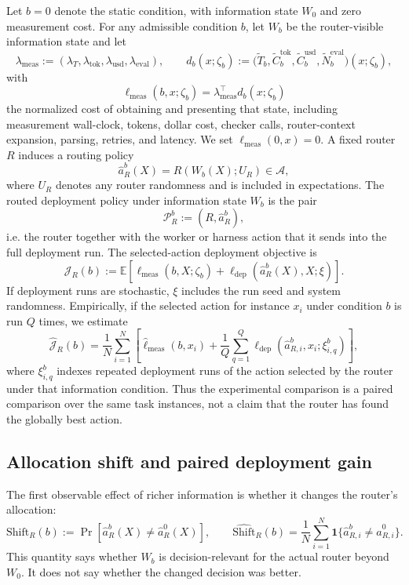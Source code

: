 \documentclass{article}
\newcommand{\cA}{\mathcal{A}}
\newcommand{\E}{\mathbb{E}}
\newcommand{\J}{\mathcal{J}}
\newcommand{\one}{\mathbf{1}}
\begin{document}
Let $b=0$ denote the static condition, with information state $W_0$ and zero measurement cost.
For any admissible condition $b$, let $W_b$ be the router-visible information state and let
\[
\lambda_{\mathrm{meas}}
:=
(\lambda_T,\lambda_{\mathrm{tok}},\lambda_{\mathrm{usd}},\lambda_{\mathrm{eval}}),
\qquad
d_b(x;\zeta_b)
:=
\bigl(
\widetilde T_b,
\widetilde C^{\mathrm{tok}}_b,
\widetilde C^{\mathrm{usd}}_b,
\widetilde N^{\mathrm{eval}}_b
\bigr)(x;\zeta_b),
\]
with
\[
\ell_{\mathrm{meas}}(b,x;\zeta_b)
=
\lambda_{\mathrm{meas}}^\top d_b(x;\zeta_b)
\]
the normalized cost of obtaining and presenting that state, including measurement wall-clock, tokens, dollar cost, checker calls, router-context expansion, parsing, retries, and latency.
We set $\ell_{\mathrm{meas}}(0,x)=0$.
A fixed router $R$ induces a routing policy
\[
\hat a_R^b(X)=R(W_b(X);U_R)\in\cA,
\]
where $U_R$ denotes any router randomness and is included in expectations.
The routed deployment policy under information state $W_b$ is the pair
\[
\mathcal{P}_R^b := (R,\hat a_R^b),
\]
i.e. the router together with the worker or harness action that it sends into the full deployment run.
The selected-action deployment objective is
\begin{equation}
\J_R(b)
:=
\E\left[
\ell_{\mathrm{meas}}(b,X;\zeta_b)
+\ell_{\mathrm{dep}}(\hat a_R^b(X),X;\xi)
\right].
\label{eq:router-objective}
\end{equation}
If deployment runs are stochastic, $\xi$ includes the run seed and system randomness.
Empirically, if the selected action for instance $x_i$ under condition $b$ is run $Q$ times, we estimate
\begin{equation}
\widehat{\J}_R(b)
=
\frac{1}{N}\sum_{i=1}^N
\left[
\widehat{\ell}_{\mathrm{meas}}(b,x_i)
+
\frac{1}{Q}\sum_{q=1}^Q
\ell_{\mathrm{dep}}(\hat a_{R,i}^b,x_i;\xi_{i,q}^{b})
\right],
\label{eq:empirical-router-objective}
\end{equation}
where $\xi_{i,q}^{b}$ indexes repeated deployment runs of the action selected by the router under that information condition.
Thus the experimental comparison is a paired comparison over the same task instances, not a claim that the router has found the globally best action.

\subsection{Allocation shift and paired deployment gain}

The first observable effect of richer information is whether it changes the router's allocation:
\[
\mathrm{Shift}_R(b)
:=
\Pr\!\left[\hat a_R^b(X)\neq \hat a_R^0(X)\right],
\qquad
\widehat{\mathrm{Shift}}_R(b)
=
\frac{1}{N}\sum_{i=1}^N
\one\{\hat a_{R,i}^b\neq \hat a_{R,i}^0\}.
\]
This quantity says whether $W_b$ is decision-relevant for the actual router beyond $W_0$.
It does not say whether the changed decision was better.
\end{document}
